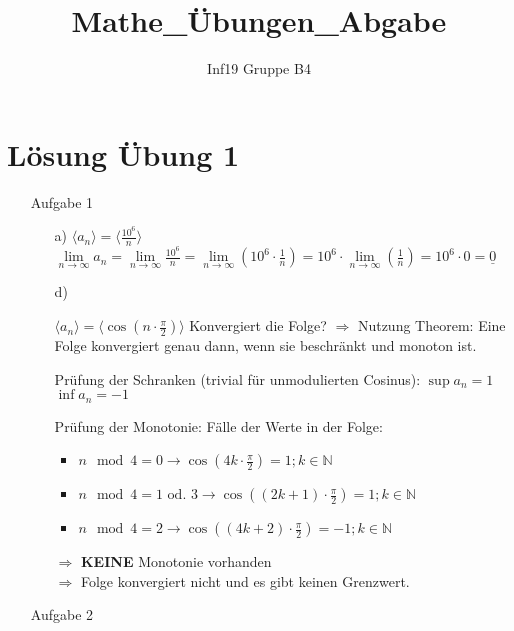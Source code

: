\documentclass{scrreprt}
\title{Mathe\_Übungen\_Abgabe} %
\author{Inf19 Gruppe B4}
\begin{document}
    \maketitle

    \newpage
    \setcounter{page}{1}

    \section*{Lösung Übung 1}
    \begin{enumerate}
        \item[Aufgabe 1]
        \begin{enumerate}
            \item[a)]{
                $\langle a_n \rangle = \langle \frac{10^6}{n}\rangle$\newline
                $\lim \limits_{n \to \infty} a_n = \lim \limits_{n \to \infty} \frac{10^6}{n} = \lim \limits_{n \to \infty} (10^6 \cdot \frac{1}{n} ) = 10^6 \cdot \lim \limits_{n \to \infty} (\frac{1}{n}) = 10^6 \cdot 0 = \underline{0}$
            }
            \item[d)]{
                $\langle a_n \rangle = \langle\cos(n\cdot\frac{\pi}{2})\rangle$\newline
                Konvergiert die Folge?\newline
                $\Rightarrow$ Nutzung Theorem: Eine Folge konvergiert genau dann, wenn sie beschränkt und monoton ist.\newline

                Prüfung der Schranken (trivial für unmodulierten Cosinus):\newline
                \textbullet $\sup a_n = 1$\newline
                \textbullet $\inf a_n = -1$\newline

                Prüfung der Monotonie:\newline
                Fälle der Werte in der Folge:
                \begin{itemize}
                    \item{$n\mod 4 = 0 \rightarrow \cos(4k\cdot \frac{\pi}{2}) = 1 ; k\in \mathbb{N} $}
                    \item{$n\mod 4 = 1 \text{ od. } 3 \rightarrow \cos((2k + 1)\cdot \frac{\pi}{2}) = 1 ; k\in \mathbb{N} $}
                    \item{$n\mod 4 = 2 \rightarrow \cos((4k + 2)\cdot \frac{\pi}{2}) = -1 ; k\in \mathbb{N} $}
                \end{itemize}
                $\Rightarrow$ \textbf{KEINE} Monotonie vorhanden\\
                $\Rightarrow$ Folge konvergiert nicht und es gibt keinen Grenzwert.
            }
        \end{enumerate}
        \item[Aufgabe 2]
    \end{enumerate}
\end{document}
